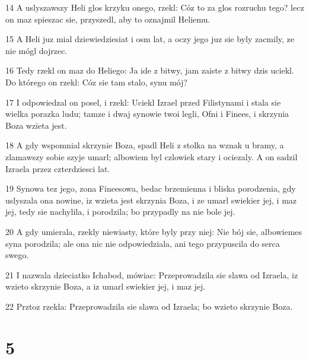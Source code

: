 \par 14 A uslyszawszy Heli glos krzyku onego, rzekl: Cóz to za glos rozruchu tego? lecz on maz spieszac sie, przyszedl, aby to oznajmil Heliemu.
\par 15 A Heli juz mial dziewiedziesiat i osm lat, a oczy jego juz sie byly zacmily, ze nie mógl dojrzec.
\par 16 Tedy rzekl on maz do Heliego: Ja ide z bitwy, jam zaiste z bitwy dzis uciekl. Do którego on rzekl: Cóz sie tam stalo, synu mój?
\par 17 I odpowiedzal on posel, i rzekl: Uciekl Izrael przed Filistynami i stala sie wielka porazka ludu; tamze i dwaj synowie twoi legli, Ofni i Finees, i skrzynia Boza wzieta jest.
\par 18 A gdy wspomnial skrzynie Boza, spadl Heli z stolka na wznak u bramy, a zlamawszy sobie szyje umarl; albowiem byl czlowiek stary i ociezaly. A on sadzil Izraela przez czterdziesci lat.
\par 19 Synowa tez jego, zona Fineesowa, bedac brzemienna i bliska porodzenia, gdy uslyszala ona nowine, iz wzieta jest skrzynia Boza, i ze umarl swiekier jej, i maz jej, tedy sie nachylila, i porodzila; bo przypadly na nie bole jej.
\par 20 A gdy umierala, rzekly niewiasty, które byly przy niej: Nie bój sie, albowiemes syna porodzila; ale ona nic nie odpowiedziala, ani tego przypuscila do serca swego.
\par 21 I nazwala dzieciatko Ichabod, mówiac: Przeprowadzila sie slawa od Izraela, iz wzieto skrzynie Boza, a iz umarl swiekier jej, i maz jej.
\par 22 Prztoz rzekla: Przeprowadzila sie slawa od Izraela; bo wzieto skrzynie Boza.

\chapter{5}

